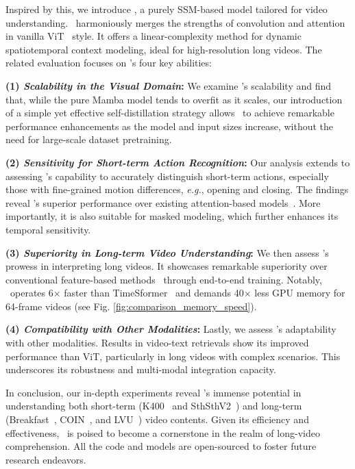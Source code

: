Inspired by this, 
we introduce \ModelName, 
a purely SSM-based model tailored for video understanding. 
\ModelName\ harmoniously merges the strengths of convolution and attention in vanilla ViT~\cite{vit} style.
It offers a linear-complexity method for dynamic spatiotemporal context modeling, 
ideal for high-resolution long videos. 
The related evaluation focuses on \ModelName's four key abilities:

\textbf{(1) \textit{Scalability in the Visual Domain}:} 
We examine \ModelName's scalability and find that, while the pure Mamba model tends to overfit as it scales, 
our introduction of a simple yet effective self-distillation strategy allows \ModelName\ to achieve remarkable performance enhancements as the model and input sizes increase,
without the need for large-scale dataset pretraining.

\textbf{(2) \textit{Sensitivity for Short-term Action Recognition}:} 
Our analysis extends to assessing \ModelName's capability to accurately distinguish short-term actions,
especially those with fine-grained motion differences, 
\textit{e.g.}, 
opening and closing. 
The findings reveal \ModelName's superior performance over existing attention-based models~\cite{timesformer,vivit,video_swin}.
More importantly,
it is also suitable for masked modeling,
which further enhances its temporal sensitivity. 

\textbf{(3) \textit{Superiority in Long-term Video Understanding}:} 
We then assess \ModelName's prowess in interpreting long videos.
It showcases remarkable superiority over conventional feature-based methods~\cite{vis4mer,distant} through end-to-end training. 
Notably, 
\ModelName\ operates 6$\times$ faster than TimeSformer~\cite{timesformer} and demands 40$\times$ less GPU memory for 64-frame videos (see Fig. \ref{fig:comparison_memory_speed}).

\textbf{(4) \textit{Compatibility with Other Modalities}:} 
Lastly, 
we assess \ModelName's adaptability with other modalities. 
Results in video-text retrievals show its improved performance than ViT, 
particularly in long videos with complex scenarios.
This underscores its robustness and multi-modal integration capacity.

In conclusion, 
our in-depth experiments reveal \ModelName's immense potential in understanding both short-term (K400~\cite{k400} and SthSthV2~\cite{sth}) and long-term (Breakfast~\cite{breakfast}, COIN~\cite{coin}, and LVU~\cite{lvu}) video contents. 
Given its efficiency and effectiveness, 
\ModelName\ is poised to become a cornerstone in the realm of long-video comprehension.
All the code and models are open-sourced to foster future research endeavors.
